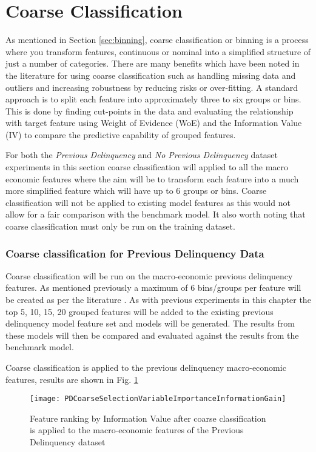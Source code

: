\section{Coarse Classification}
As mentioned in Section \ref{sec:binning}, coarse classification or binning is a process where you transform features, continuous or nominal into a simplified structure of just a number of categories. There are many benefits which have been noted in the literature for using coarse classification such as handling missing data and outliers and increasing robustness by reducing risks or over-fitting. A standard approach is to split each feature into approximately three to six groups or bins. This is done by finding cut-points in the data and evaluating the relationship with target feature using Weight of Evidence (WoE) and the Information Value (IV) to compare the predictive capability of grouped features.

For both the \textit{Previous Delinquency} and \textit{No Previous Delinquency} dataset experiments in this section coarse classification will applied to all the macro economic features where the aim will be to transform each feature into a much more simplified feature which will have up to 6 groups or bins. Coarse classification will not be applied to existing model features as this would not allow for a fair comparison with the benchmark model. It also worth noting that coarse classification must only be run on the training dataset.


\subsubsection{Coarse classification for Previous Delinquency Data}
Coarse classification will be run on the macro-economic previous delinquency features. As mentioned previously a maximum of 6 bins/groups per feature will be created as per the literature  \citep{hand_optimal_2005}. As with previous experiments in this chapter the top 5, 10, 15, 20 grouped features will be added to the existing previous delinquency model feature set and models will be generated. The results from these models will then be compared and evaluated against the results from the benchmark model.

Coarse classification is applied to the previous delinquency macro-economic features, results are shown in Fig. \ref{fig:PDCoarseSelectionVariableImportanceInformationGain}

\begin{figure}[H]
	\texttt{[image: PDCoarseSelectionVariableImportanceInformationGain]}
	\caption{Feature ranking by Information Value after coarse classification \\is applied to the macro-economic features of the Previous Delinquency dataset}
	\label{fig:PDCoarseSelectionVariableImportanceInformationGain}
\end{figure}

